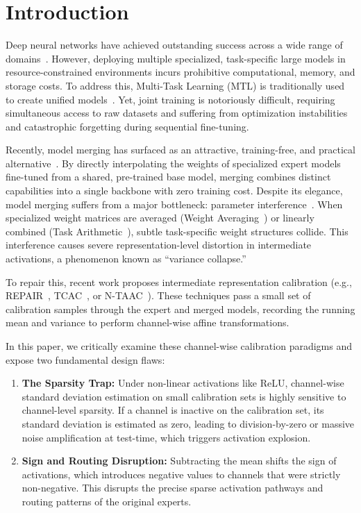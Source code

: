 \documentclass{article}
\theoremstyle{plain}
\theoremstyle{definition}
\theoremstyle{remark}
\begin{document}
\section{Introduction}
\label{sec:intro}

Deep neural networks have achieved outstanding success across a wide range of domains~\cite{he2016deep,vaswani2017attention,dosovitskiy2020image,devlin2018bert,brown2020language,touvron2023llama}. However, deploying multiple specialized, task-specific large models in resource-constrained environments incurs prohibitive computational, memory, and storage costs. To address this, Multi-Task Learning (MTL) is traditionally used to create unified models~\cite{caruana1997multitask,sener2018multi,chen2018gradnorm,yu2020gradient}. Yet, joint training is notoriously difficult, requiring simultaneous access to raw datasets and suffering from optimization instabilities and catastrophic forgetting during sequential fine-tuning.

Recently, model merging has surfaced as an attractive, training-free, and practical alternative~\cite{wortsman2022model,ilharco2022editing}. By directly interpolating the weights of specialized expert models fine-tuned from a shared, pre-trained base model, merging combines distinct capabilities into a single backbone with zero training cost. Despite its elegance, model merging suffers from a major bottleneck: parameter interference~\cite{yadav2023resolving}. When specialized weight matrices are averaged (Weight Averaging~\cite{wortsman2022model}) or linearly combined (Task Arithmetic~\cite{ilharco2022editing}), subtle task-specific weight structures collide. This interference causes severe representation-level distortion in intermediate activations, a phenomenon known as ``variance collapse.''

To repair this, recent work proposes intermediate representation calibration (e.g., REPAIR~\cite{jordan2023repair}, TCAC~\cite{tcac2025}, or N-TAAC~\cite{tcac2025}). These techniques pass a small set of calibration samples through the expert and merged models, recording the running mean and variance to perform channel-wise affine transformations. 

In this paper, we critically examine these channel-wise calibration paradigms and expose two fundamental design flaws:
\begin{enumerate}
    \item \textbf{The Sparsity Trap:} Under non-linear activations like ReLU, channel-wise standard deviation estimation on small calibration sets is highly sensitive to channel-level sparsity. If a channel is inactive on the calibration set, its standard deviation is estimated as zero, leading to division-by-zero or massive noise amplification at test-time, which triggers activation explosion.
    \item \textbf{Sign and Routing Disruption:} Subtracting the mean shifts the sign of activations, which introduces negative values to channels that were strictly non-negative. This disrupts the precise sparse activation pathways and routing patterns of the original experts.
\end{enumerate}
\end{document}
